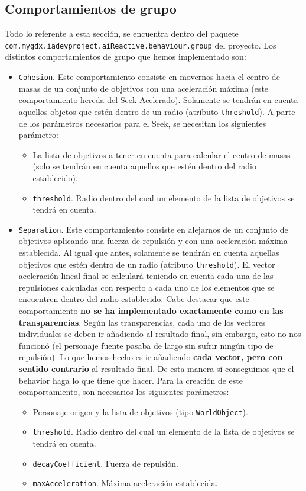 \subsection{Comportamientos de grupo}
Todo lo referente a esta sección, se encuentra dentro del paquete \\ \texttt{com.mygdx.iadevproject.aiReactive.behaviour.group} del proyecto. Los distintos comportamientos de grupo que hemos implementado son:
\begin{itemize}
 \item \texttt{Cohesion}. Este comportamiento consiste en movernos hacia el centro de masas de un conjunto de objetivos con una aceleración máxima (este comportamiento hereda del Seek Acelerado). Solamente se tendrán en cuenta aquellos objetos que estén dentro de un radio (atributo \texttt{threshold}). A parte de los parámetros necesarios para el Seek, se necesitan los siguientes parámetro:
 \begin{itemize}
 	\item La lista de objetivos a tener en cuenta para calcular el centro de masas (solo se tendrán en cuenta aquellos que estén dentro del radio establecido).
 	\item \texttt{threshold}. Radio dentro del cual un elemento de la lista de objetivos se tendrá en cuenta.
 \end{itemize}
 \item \texttt{Separation}. Este comportamiento consiste en alejarnos de un conjunto de objetivos aplicando una fuerza de repulsión y con una aceleración máxima establecida. Al igual que antes, solamente se tendrán en cuenta aquellas objetivos que estén dentro de un radio (atributo \texttt{threshold}). El vector aceleración lineal final se calculará teniendo en cuenta cada una de las repulsiones calculadas con respecto a cada uno de los elementos que se encuentren dentro del radio establecido. Cabe destacar que este comportamiento \textbf{no se ha implementado exactamente como en las transparencias}. Según las transparencias, cada uno de los vectores individuales se deben ir añadiendo al resultado final, sin embargo, esto no nos funcionó (el personaje fuente pasaba de largo sin sufrir ningún tipo de repulsión). Lo que hemos hecho es ir añadiendo \textbf{cada vector, pero con sentido contrario} al resultado final. De esta manera sí conseguimos que el behavior haga lo que tiene que hacer. Para la creación de este comportamiento, son necesarios los siguientes parámetros:
 \begin{itemize}
 	\item Personaje origen y la lista de objetivos (tipo \texttt{WorldObject}).
 	\item \texttt{threshold}. Radio dentro del cual un elemento de la lista de objetivos se tendrá en cuenta.
 	\item \texttt{decayCoefficient}. Fuerza de repulsión.
 	\item \texttt{maxAcceleration}. Máxima aceleración establecida.
 \end{itemize}
\end{itemize}

